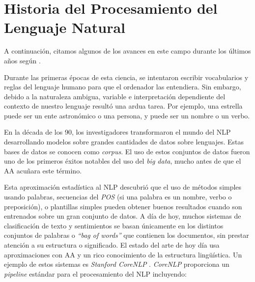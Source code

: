 \section{Historia del Procesamiento del Lenguaje Natural}
\label{sec:currentnlp}

A continuación, citamos algunos de los avances en este campo durante los últimos
años según \citet{Hirschberg2015}.

Durante las primeras épocas de esta ciencia, se intentaron escribir vocabularios
y reglas del lenguaje humano para que el ordenador las entendiera. Sin embargo,
debido a la naturaleza ambigua, variable e interpretación dependiente del
contexto de nuestro lenguaje resultó una ardua tarea. Por ejemplo, una estrella
puede ser un ente astronómico o una persona, y puede ser un nombre o un verbo.

En la década de los 90, los investigadores transformaron el mundo del \ac{NLP}
desarrollando modelos sobre grandes cantidades de datos sobre lenguajes. Estas
bases de datos se conocen como \emph{corpus}. El uso de estos conjuntos de datos
fueron uno de los primeros éxitos notables del uso del \emph{big data}, mucho
antes de que el \ac{AA} acuñara este término.

Esta aproximación estadística al \ac{NLP} descubrió que el uso de métodos
simples usando palabras, secuencias del \emph{\ac{POS}} (si una palabra es un nombre, verbo o
preposición), o plantillas simples pueden obtener buenos resultados cuando son
entrenados sobre un gran conjunto de datos. A día de hoy, muchos sistemas de
clasificación de texto y sentimientos se basan únicamente en los distintos
conjuntos de palabras o \emph{``bag of words''} que contienen los documentos,
sin prestar atención a su estructura o significado. El estado del arte de hoy
día usa aproximaciones con \ac{AA} y un rico conocimiento de la estructura
lingüística. Un ejemplo de estos sistemas es \emph{Stanford CoreNLP}
\citep{Manning2014}. \emph{CoreNLP} proporciona un \emph{pipeline} estándar para
el procesamiento del \ac{NLP} incluyendo:

